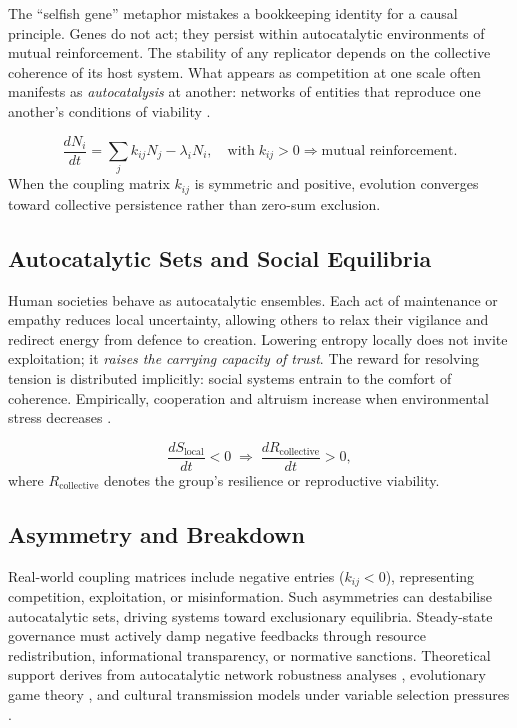 \documentclass[12pt,a4paper]{article}
\begin{document}
The ``selfish gene'' metaphor mistakes a bookkeeping identity for a causal principle.
Genes do not act; they persist within autocatalytic environments of mutual reinforcement.
The stability of any replicator depends on the
collective coherence of its host system.
What appears as competition at one scale often
manifests as \emph{autocatalysis} at another:
networks of entities that reproduce one another’s conditions of viability
\citep{capra2021systems,morin2008method}.

\[
\frac{dN_i}{dt} = 
\sum_j k_{ij} N_j - \lambda_i N_i,
\quad
\text{with}\;
k_{ij} > 0
\Rightarrow
\text{mutual reinforcement.}
\]
When the coupling matrix $k_{ij}$ is symmetric and positive, evolution converges
toward collective persistence rather than zero-sum exclusion.

\subsection{Autocatalytic Sets and Social Equilibria}

Human societies behave as autocatalytic ensembles.
Each act of maintenance or empathy reduces local uncertainty,
allowing others to relax their vigilance and redirect energy from defence to creation.
Lowering entropy locally does not invite exploitation; it 
\emph{raises the carrying capacity of trust}.
The reward for resolving tension is distributed implicitly:
social systems entrain to the comfort of coherence.
Empirically, cooperation and altruism increase
when environmental stress decreases
\citep{bernhard2021cooperation}.

\[
\frac{dS_{\text{local}}}{dt} < 0
\;\Rightarrow\;
\frac{dR_{\text{collective}}}{dt} > 0,
\]
where $R_{\text{collective}}$ denotes the group’s resilience or reproductive viability.

\subsection{Asymmetry and Breakdown}

Real-world coupling matrices include negative entries ($k_{ij} < 0$), 
representing competition, exploitation, or misinformation. 
Such asymmetries can destabilise autocatalytic sets, 
driving systems toward exclusionary equilibria. 
Steady-state governance must actively damp negative feedbacks 
through resource redistribution, informational transparency, 
or normative sanctions. Theoretical support derives from 
autocatalytic network robustness analyses \citep{kauffman1993origins}, 
evolutionary game theory \citep{nowak2006five}, 
and cultural transmission models under variable selection pressures 
\citep{henrich2016cooperation}.
\end{document}
